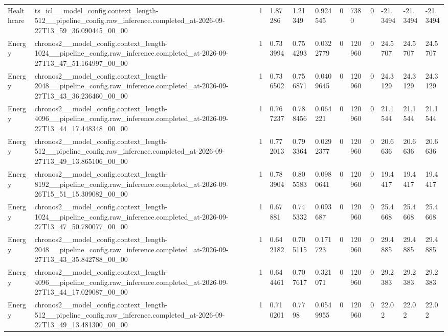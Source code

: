 \begin{tabular}{llllllllllll}
Healthcare & ts\_icl\_\_model\_config.context\_length-512\_\_pipeline\_config.raw\_inference.completed\_at-2026-09-27T13\_59\_36.090445\_00\_00 & 1 & 1.87286 & 1.21349 & 0.924545 & 0 & 7380 & 0 & -21.3494 & -21.3494 & -21.3494 \\
Energy & chronos2\_\_model\_config.context\_length-1024\_\_pipeline\_config.raw\_inference.completed\_at-2026-09-27T13\_47\_51.164997\_00\_00 & 1 & 0.733994 & 0.754293 & 0.0322779 & 0 & 120960 & 0 & 24.5707 & 24.5707 & 24.5707 \\
Energy & chronos2\_\_model\_config.context\_length-2048\_\_pipeline\_config.raw\_inference.completed\_at-2026-09-27T13\_43\_36.236460\_00\_00 & 1 & 0.736502 & 0.756871 & 0.0409645 & 0 & 120960 & 0 & 24.3129 & 24.3129 & 24.3129 \\
Energy & chronos2\_\_model\_config.context\_length-4096\_\_pipeline\_config.raw\_inference.completed\_at-2026-09-27T13\_44\_17.448348\_00\_00 & 1 & 0.767237 & 0.788456 & 0.064221 & 0 & 120960 & 0 & 21.1544 & 21.1544 & 21.1544 \\
Energy & chronos2\_\_model\_config.context\_length-512\_\_pipeline\_config.raw\_inference.completed\_at-2026-09-27T13\_49\_13.865106\_00\_00 & 1 & 0.772013 & 0.793364 & 0.0292377 & 0 & 120960 & 0 & 20.6636 & 20.6636 & 20.6636 \\
Energy & chronos2\_\_model\_config.context\_length-8192\_\_pipeline\_config.raw\_inference.completed\_at-2026-09-26T15\_51\_15.309082\_00\_00 & 1 & 0.783904 & 0.805583 & 0.0980641 & 0 & 120960 & 0 & 19.4417 & 19.4417 & 19.4417 \\
Energy & chronos2\_\_model\_config.context\_length-1024\_\_pipeline\_config.raw\_inference.completed\_at-2026-09-27T13\_47\_50.780077\_00\_00 & 1 & 0.67881 & 0.745332 & 0.093687 & 0 & 120960 & 0 & 25.4668 & 25.4668 & 25.4668 \\
Energy & chronos2\_\_model\_config.context\_length-2048\_\_pipeline\_config.raw\_inference.completed\_at-2026-09-27T13\_43\_35.842788\_00\_00 & 1 & 0.642182 & 0.705115 & 0.171723 & 0 & 120960 & 0 & 29.4885 & 29.4885 & 29.4885 \\
Energy & chronos2\_\_model\_config.context\_length-4096\_\_pipeline\_config.raw\_inference.completed\_at-2026-09-27T13\_44\_17.029087\_00\_00 & 1 & 0.644461 & 0.707617 & 0.321071 & 0 & 120960 & 0 & 29.2383 & 29.2383 & 29.2383 \\
Energy & chronos2\_\_model\_config.context\_length-512\_\_pipeline\_config.raw\_inference.completed\_at-2026-09-27T13\_49\_13.481300\_00\_00 & 1 & 0.710201 & 0.7798 & 0.0549955 & 0 & 120960 & 0 & 22.02 & 22.02 & 22.02 \\

\end{tabular}
